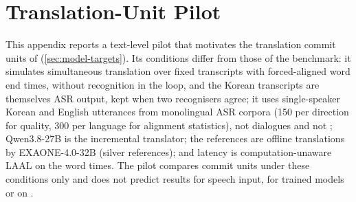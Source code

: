 \section{Translation-Unit Pilot}\label{app:units}

This appendix reports a text-level pilot that motivates the translation commit units of \model (\cref{sec:model-targets}). Its conditions differ from those of the benchmark: it simulates simultaneous translation over fixed transcripts with forced-aligned word end times, without recognition in the loop, and the Korean transcripts are themselves ASR output, kept when two recognisers agree; it uses single-speaker Korean and English utterances from monolingual ASR corpora (150 per direction for quality, 300 per language for alignment statistics), not dialogues and not ; Qwen3.8-27B is the incremental translator; the references are offline translations by EXAONE-4.0-32B \citep{lgai2025exaone4} (silver references); and latency is computation-unaware LAAL on the word times. The pilot compares commit units under these conditions only and does not predict results for speech input, for trained models or on \taxi.

